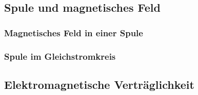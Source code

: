 \subsection{Spule und magnetisches Feld}
\subsubsection{Magnetisches Feld in einer Spule}
\subsubsection{Spule im Gleichstromkreis}

\subsection{Elektromagnetische Verträglichkeit}


